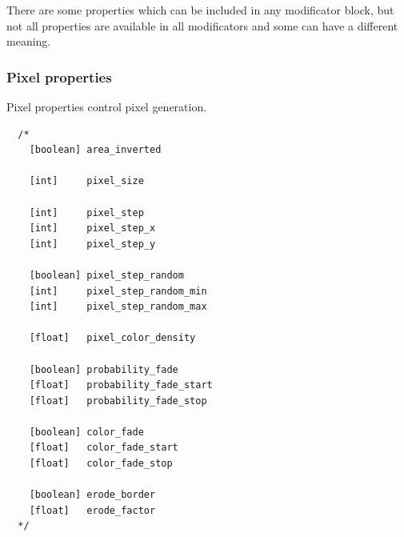\documentclass[9pt]{article}
\begin{document}
There are some properties which can be included in 
any modificator block, but not all properties are 
available in all modificators and some 
can have a different meaning.

\subsubsection{Pixel properties}

Pixel properties control pixel generation. 

\begin{verbatim}
  /*
    [boolean] area_inverted
    
    [int]     pixel_size
    
    [int]     pixel_step
    [int]     pixel_step_x
    [int]     pixel_step_y
  
    [boolean] pixel_step_random
    [int]     pixel_step_random_min
    [int]     pixel_step_random_max
    
    [float]   pixel_color_density
    
    [boolean] probability_fade
    [float]   probability_fade_start
    [float]   probability_fade_stop
  
    [boolean] color_fade
    [float]   color_fade_start
    [float]   color_fade_stop
      
    [boolean] erode_border
    [float]   erode_factor
  */    
\end{verbatim}
\end{document}
